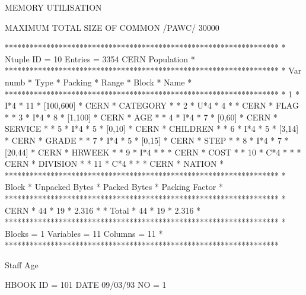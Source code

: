 \begin{Listing}
 MEMORY UTILISATION

      MAXIMUM TOTAL SIZE OF COMMON /PAWC/            30000

\newpage

 ******************************************************************
 * Ntuple ID = 10     Entries = 3354      CERN Population         *
 ******************************************************************
 * Var numb * Type * Packing *    Range     *  Block   *  Name    *
 ******************************************************************
 *      1   * I*4  *    11   * [100,600]    * CERN     * CATEGORY *
 *      2   * U*4  *    4    *              * CERN     * FLAG     *
 *      3   * I*4  *    8    * [1,100]      * CERN     * AGE      *
 *      4   * I*4  *    7    * [0,60]       * CERN     * SERVICE  *
 *      5   * I*4  *    5    * [0,10]       * CERN     * CHILDREN *
 *      6   * I*4  *    5    * [3,14]       * CERN     * GRADE    *
 *      7   * I*4  *    5    * [0,15]       * CERN     * STEP     *
 *      8   * I*4  *    7    * [20,44]      * CERN     * HRWEEK   *
 *      9   * I*4  *         *              * CERN     * COST     *
 *     10   * C*4  *         *              * CERN     * DIVISION *
 *     11   * C*4  *         *              * CERN     * NATION   *
 ******************************************************************
 *  Block   * Unpacked Bytes * Packed Bytes *   Packing Factor    *
 ******************************************************************
 * CERN     *    44          *    19        *    2.316            *
 * Total    *    44          *    19        *    2.316            *
 ******************************************************************
 * Blocks = 1            Variables = 11           Columns = 11    *
 ******************************************************************

 Staff Age                                                                       
 
 HBOOK     ID =       101                                        DATE  09/03/93              NO =     1
 

\end{Listing}

